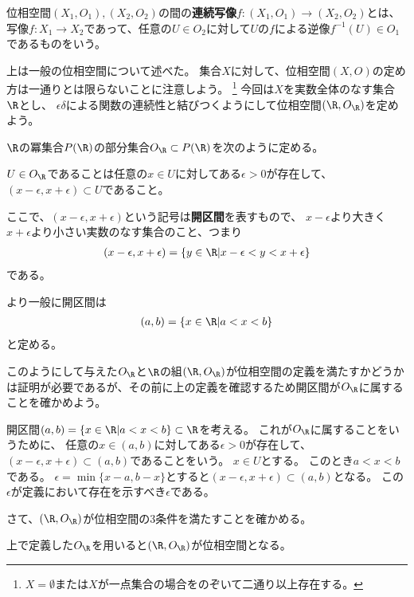 \documentclass[uplatex]{jsarticle}
\begin{document}
\begin{dfn}[位相空間の間の連続写像]\label{topsp}
  位相空間$(X_1,O_1), (X_2,O_2)$の間の\textbf{連続写像}$f:(X_1,O_1)\to(X_2,O_2)$とは、
  写像$f:X_1\to X_2$であって、任意の$U\in O_2$に対して$U$の$f$による逆像$f^{-1}(U)\in O_1$であるものをいう。
\end{dfn}

上は一般の位相空間について述べた。
集合$X$に対して、位相空間$(X,O)$の定め方は一通りとは限らないことに注意しよう。
\footnote{$X=\emptyset$または$X$が一点集合の場合をのぞいて二通り以上存在する。}
今回は$X$を実数全体のなす集合$\R$とし、
$\epsilon\delta$による関数の連続性と結びつくようにして位相空間$(\R,O_\R)$を定めよう。

\begin{dfn}[実数の位相]
  $\R$の冪集合$P(\R)$の部分集合$O_\R\subset P(\R)$を次のように定める。
  
  $U\in O_\R$であることは任意の$x\in U$に対してある$\epsilon>0$が存在して、
  $(x-\epsilon,x+\epsilon)\subset U$であること。
\end{dfn}

ここで、$(x-\epsilon,x+\epsilon)$という記号は\textbf{開区間}を表すもので、
$x-\epsilon$より大きく$x+\epsilon$より小さい実数のなす集合のこと、つまり
\begin{align*}
  (x-\epsilon,x+\epsilon)=\{y\in\R\vert x-\epsilon<y<x+\epsilon\}
\end{align*}
である。

より一般に開区間は
\begin{align*}
  (a,b)=\{x\in\R\vert a<x<b\}
\end{align*}
と定める。

このようにして与えた$O_\R$と$\R$の組$(\R,O_\R)$が位相空間の定義を満たすかどうかは証明が必要であるが、その前に上の定義を確認するため開区間が$O_\R$に属することを確かめよう。

\begin{eg}
  開区間$(a,b)=\{x\in\R\vert a<x<b\}\subset\R$を考える。
  これが$O_\R$に属することをいうために、
  任意の$x\in (a,b)$に対してある$\epsilon>0$が存在して、$(x-\epsilon,x+\epsilon)\subset(a,b)$であることをいう。
  $x\in U$とする。
  このとき$a<x<b$である。
  $\epsilon=\min\{x-a,b-x\}$とすると$(x-\epsilon,x+\epsilon)\subset(a,b)$となる。
  この$\epsilon$が定義において存在を示すべき$\epsilon$である。
\end{eg}

さて、$(\R,O_\R)$が位相空間の$3$条件を満たすことを確かめる。

\begin{prop}
  上で定義した$O_\R$を用いると$(\R,O_\R)$が位相空間となる。
\end{prop}
\end{document}

